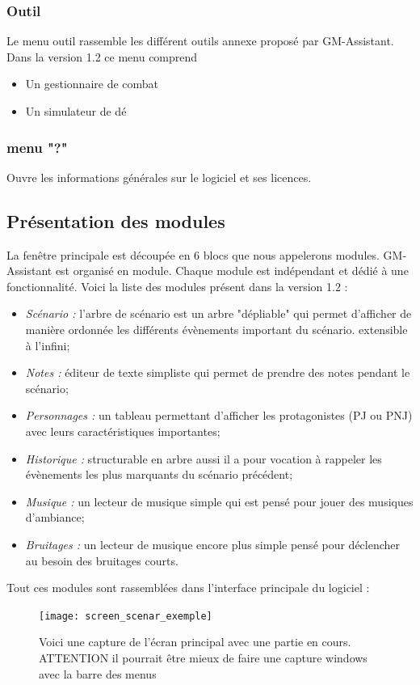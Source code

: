 \documentclass[a4paper,12pt]{article}
\newcommand*{\GMA}{GM-Assistant\xspace}
\begin{document}
\subsubsection{Outil}
Le menu outil rassemble les différent outils annexe proposé par \GMA.
Dans la version 1.2 ce menu comprend
\begin{itemize}
    \item Un gestionnaire de combat
    \item Un simulateur de dé
\end{itemize}

\subsubsection{menu "?"} Ouvre les informations générales sur le logiciel et ses licences.

\subsection{Présentation des modules}\label{modules}
La fenêtre principale est découpée en 6 blocs que nous appelerons modules.
\GMA est organisé en module. Chaque module est indépendant et dédié à une fonctionnalité. Voici la liste des modules présent  dans la version 1.2 :
\begin{itemize}
    \item \emph{Scénario :} l'arbre de scénario est un arbre "dépliable" qui permet d'afficher de manière ordonnée les différents évènements important du scénario. extensible à l'infini;
    \item \emph{Notes :} éditeur de texte simpliste qui permet de prendre des notes pendant le scénario;
    \item \emph{Personnages :} un tableau permettant d'afficher les protagonistes (PJ ou PNJ) avec leurs caractéristiques importantes;
    \item \emph{Historique :} structurable en arbre aussi il a pour vocation à rappeler les évènements les plus marquants du scénario précédent;
    \item \emph{Musique :} un lecteur de musique simple qui est pensé pour jouer des musiques d'ambiance;
    \item \emph{Bruitages :} un lecteur de musique encore plus simple pensé pour déclencher au besoin des bruitages courts.
\end{itemize}
Tout ces modules sont rassemblées dans l'interface principale du logiciel :
\begin{figure}[h]
    \texttt{[image: screen\_scenar\_exemple]}
    \caption{Voici une capture de l'écran principal avec une partie en cours.
    ATTENTION il pourrait être mieux de faire une capture windows avec la barre des menus}
\end{figure}
\end{document}

